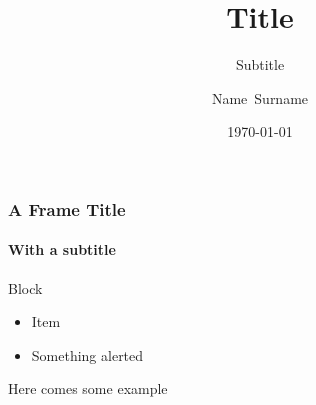 \documentclass[10pt]{beamer}
\title{Title}
\subtitle{Subtitle}
\author{Name~Surname}
\institute[ShortInst]{Institute Name}
\date[\today]{\today}
\begin{document}
\begin{frame}[plain]
  \titlepage
\end{frame}


\begin{frame}
\frametitle{A Frame Title}
\framesubtitle{With a subtitle}
\begin{block}{Block}
\begin{itemize}
	\item Item
	\item \alert{Something alerted}
\end{itemize}
\end{block}
\begin{example}
Here comes some example
\end{example}
\end{frame}
\end{document}
